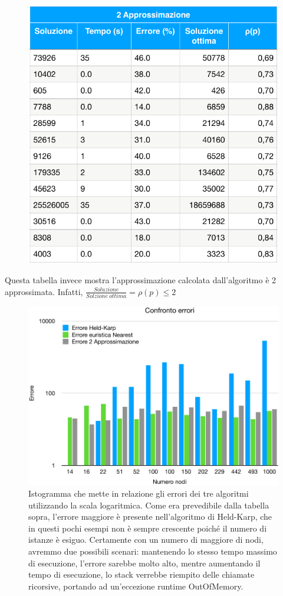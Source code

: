 \documentclass[a4paper]{article}
\begin{document}
\begin{figure}[H]
	\centering
	\includegraphics[width=0.5\linewidth]{2approx}
	\label{fig:2approx}
\end{figure}
Questa tabella invece mostra l'approssimazione calcolata dall'algoritmo è 2 approssimata. Infatti,
$\frac{Soluzione}{Solzione\ ottima} = \rho(p) \leq 2$
\begin{figure}[H]
	\begin{center}
	\includegraphics[width=17cm]{errore}
	\caption{Istogramma che mette in relazione gli errori dei tre algoritmi utilizzando la scala logaritmica. Come era prevedibile dalla tabella sopra, l'errore maggiore è presente nell'algoritmo di Held-Karp, che in questi pochi esempi non è sempre crescente poiché il numero di istanze è esiguo. Certamente con un numero di maggiore di nodi, avremmo due possibili scenari: mantenendo lo stesso tempo massimo di esecuzione, l'errore sarebbe molto alto, mentre aumentando il tempo di esecuzione, lo stack verrebbe riempito delle chiamate ricorsive, portando ad un'eccezione runtime OutOfMemory.}	\label{fig:errore}
\end{center}
\end{figure}
\end{document}
